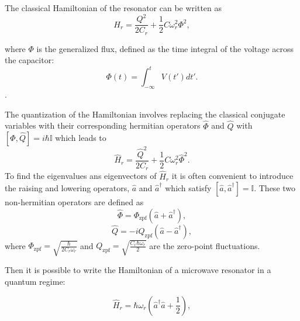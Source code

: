 The classical Hamiltonian of the resonator can be written as 
\begin{equation}\label{eq:classical_hamiltonian_resonator}
    H_r = \frac{Q^2}{2C_r} +  \frac{1}{2}C\omega_r^2\Phi^2,
\end{equation}

where $\Phi$ is the generalized flux, defined as the time integral of the voltage across the capacitor:
\begin{equation}\label{eq:generalized_flux}
    \Phi(t) = \int_{-\infty}^{t} V(t')dt' .
\end{equation}.

The quantization of the Hamiltonian involves replacing the classical conjugate variables with their corresponding hermitian operators $\hat{\Phi}$ and $\hat{Q}$ with $[\hat{\Phi},\hat{Q}]=i\hbar\mathbb{I}$ which leads to
\begin{equation}
    \hat{H}_r = \frac{\hat{Q}^2}{2C_r} +  \frac{1}{2}C\omega_r^2\hat{\Phi}^2.
\end{equation}
To find the eigenvalues ans eigenvectors of $\hat{H}_r$ it is often convenient to introduce the raising and lowering operators, $\hat{a}$ and $\hat{a}^\dagger$ which satisfy $[\hat{a},\hat{a}^\dagger]=\mathbb{I}$.
These two non-hermitian operators are defined as 
\begin{equation}\label{eq:Phi_operator}
    \hat{\Phi} =  \Phi_{\text{zpf}}(\hat{a} + \hat{a}^\dagger),
\end{equation}
\begin{equation}\label{eq:Q_operator}
    \hat{Q} = -iQ_{\text{zpf}}(\hat{a} - \hat{a}^\dagger),
\end{equation}
where $\Phi_{\text{zpf}} = \sqrt{\frac{\hbar}{2C_r\omega_r}}$ and $Q_{\text{zpf}} = \sqrt{\frac{C_r\hbar \omega_r}{2}}$ are the zero-point fluctuations.

Then it is possible to write the Hamiltonian of a microwave resonator in a quantum regime:

\begin{equation}\label{eq:quant_resonator_hamiltonian}
    \hat{H}_r = \hbar\omega_r\left(\hat{a}^\dagger\hat{a} + \frac{1}{2}\right),
\end{equation}

